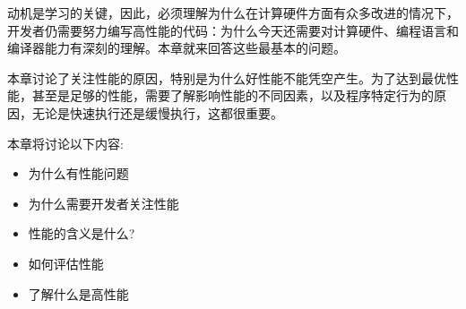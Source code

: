动机是学习的关键，因此，必须理解为什么在计算硬件方面有众多改进的情况下，开发者仍需要努力编写高性能的代码：为什么今天还需要对计算硬件、编程语言和编译器能力有深刻的理解。本章就来回答这些最基本的问题。

本章讨论了关注性能的原因，特别是为什么好性能不能凭空产生。为了达到最优性能，甚至是足够的性能，需要了解影响性能的不同因素，以及程序特定行为的原因，无论是快速执行还是缓慢执行，这都很重要。

本章将讨论以下内容:

\begin{itemize}
\item 为什么有性能问题
\item 为什么需要开发者关注性能
\item 性能的含义是什么?
\item 如何评估性能
\item 了解什么是高性能
\end{itemize}














